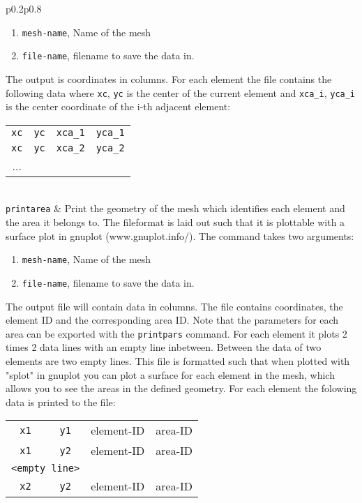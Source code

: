 \documentclass[noshowpacs,preprintnumbers,amsmath,amssymb, letter]{revtex4}
\begin{document}
\begin{longtable}{p{}p{}}
\begin{enumerate}
\item \texttt{mesh-name}, Name of the mesh
\item \texttt{file-name}, filename to save the data in.
\end{enumerate}
The output is coordinates in columns. For each element the file contains the following data where \texttt{xc}, \texttt{yc} is the center of the current element and \texttt{xca\_i}, \texttt{yca\_i} is the center coordinate of the i-th adjacent element: 
\begin{tabular}{cccc}
	\texttt{xc} & \texttt{yc} & \texttt{xca\_1} & \texttt{yca\_1} \\
	\texttt{xc} & \texttt{yc} & \texttt{xca\_2} & \texttt{yca\_2} \\
	... \\
\end{tabular}\\
\texttt{printarea}	& Print the geometry of the mesh which identifies each element and the area it belongs to. The fileformat is laid out such that it is plottable with a surface plot in gnuplot (www.gnuplot.info/).  The command takes two arguments:
\begin{enumerate}
\item \texttt{mesh-name}, Name of the mesh
\item \texttt{file-name}, filename to save the data in.
\end{enumerate}
The output file will contain data in columns. The file contains coordinates, the element ID and the corresponding area ID. Note that the parameters for each area can be exported with  the \texttt{printpars} command. For each element it plots 2 times 2 data lines with an empty line inbetween. Between the data of two elements are two empty lines. This file is formatted such that when plotted with "splot" in gnuplot you can plot a surface for each element in the mesh, which allows you to see the areas in the defined geometry. For each element the folowing data is printed to the file:\newline 
\begin{tabular}{cccc}
	\texttt{x1} & \texttt{y1} & element-ID & area-ID\\
	\texttt{x1} & \texttt{y2} & element-ID & area-ID \\
	\multicolumn{2}{l}{\texttt{<empty line>}}\\
	\texttt{x2} & \texttt{y2} & element-ID & area-ID \\

\end{tabular}
\end{longtable}
\end{document}
